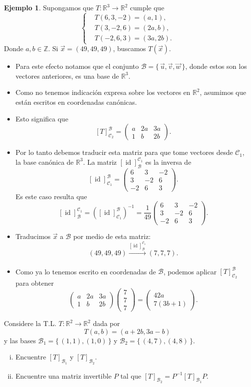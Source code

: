 \documentclass[12pt]{article}
\theoremstyle{plain}
\theoremstyle{definition}
\newtheorem{Ex}[Th]{Ejemplo}           %
\theoremstyle{remark}
\DeclareMathOperator{\id}{id}       %
\newcommand{\bR}{\mathbb{R}}        %
\newcommand{\bZ}{\mathbb{Z}}        %
\newcommand{\cB}{\mathcal{B}}       %
\newcommand{\cC}{\mathcal{C}}       %
\renewcommand{\:}{\colon}           %
\renewcommand{\.}{\Cdot}                %
\newcommand{\twobyone}[2]{\begin{pmatrix} %
  #1 \\ #2 \end{pmatrix}}
\newcommand{\twobythree}[6]{\begin{pmatrix} %
        #1 & #2 & #3\\ #4 & #5 & #6 \end{pmatrix}}
\newcommand{\threebyone}[3]{\begin{pmatrix} %
  #1 \\ #2 \\ #3 \end{pmatrix}}
\newcommand{\threebythree}[9]{\begin{pmatrix} %
  #1 & #2 & #3 \\ #4 & #5 & #6 \\ #7 & #8 & #9 \end{pmatrix}}
\newcommand{\set}[1]{\{\,#1\,\}}    %
\begin{document}
\begin{multicols}{2}
\begin{Ex}
Supongamos que $T:\bR^3\to\bR^2$ cumple que 
$$\left\lbrace
\begin{aligned}
  &T(6,3,-2)=(a,1),\\
  &T(3,-2,6)=(2a,b),\\
  &T(-2,6,3)=(3a,2b).
\end{aligned}
\right.$$
Donde $a,b\in\bZ$. Si $\vec{x}=(49,49,49)$, buscamos $T(\vec{x})$. \begin{itemize}
  \itemsep=-0.5em
  \item Para este efecto notamos que el conjunto $\cB=\set{\vec{u},\vec{v},\vec{w}}$, donde estos son los vectores anteriores, es una base de $\bR^3$. 
  \item Como no tenemos indicación expresa sobre los vectores en $\bR^2$, asumimos que están escritos en coordenadas canónicas.
  \item Esto significa que 
  $$[T]^{\cB}_{\cC_2}=\twobythree{a}{2a}{3a}{1}{b}{2b}.$$
  \item Por lo tanto debemos traducir esta matriz para que tome vectores desde $\cC_1$, la base canónica de $\bR^3$. La matriz $[\id]^{\cC_1}_\cB$ es la inversa de 
  $$[\id]^{\cB}_{\cC_1}=\threebythree{6}{3}{-2}{3}{-2}{6}{-2}{6}{3}.$$
  Es este caso resulta que 
  $$[\id]^{\cC_1}_{\cB}=([\id]^{\cB}_{\cC_1})^{-1}=\frac{1}{49}\threebythree{6}{3}{-2}{3}{-2}{6}{-2}{6}{3}.$$
  \item Traducimos $\vec{x}$ a $\cB$ por medio de esta matriz:
  $$(49,49,49)\xrightarrow[]{[\id]^{\cC_1}_{\cB}}(7,7,7).$$
  \item Como ya lo tenemos escrito en coordenadas de $\cB$, podemos aplicar $[T]^{\cB}_{\cC_2}$ para obtener 
  $$\twobythree{a}{2a}{3a}{1}{b}{2b}\threebyone{7}{7}{7}=\twobyone{42a}{7(3b+1)}.$$
\end{itemize}
\end{Ex}

\begin{ptcbP}
Considere la T.L. $T:\bR^2\to\bR^2$ dada por
$$T(a,b)=(a+2b,3a-b)$$
y las bases $\cB_1=\set{(1,1),(1,0)}$ y $\cB_2=\set{(4,7),(4,8)}$.
\vspace{-0.5em}
\begin{enumerate}[i)]
  \itemsep=-0.5em
  \item Encuentre $[T]_{\cB_1}$ y $[T]_{\cB_2}$.
  \item Encuentre una matriz invertible $P$ tal que $[T]_{\cB_2}=P^{-1}[T]_{\cB_1}P$.
\end{enumerate}
\end{ptcbP}
\end{multicols}
\end{document}
